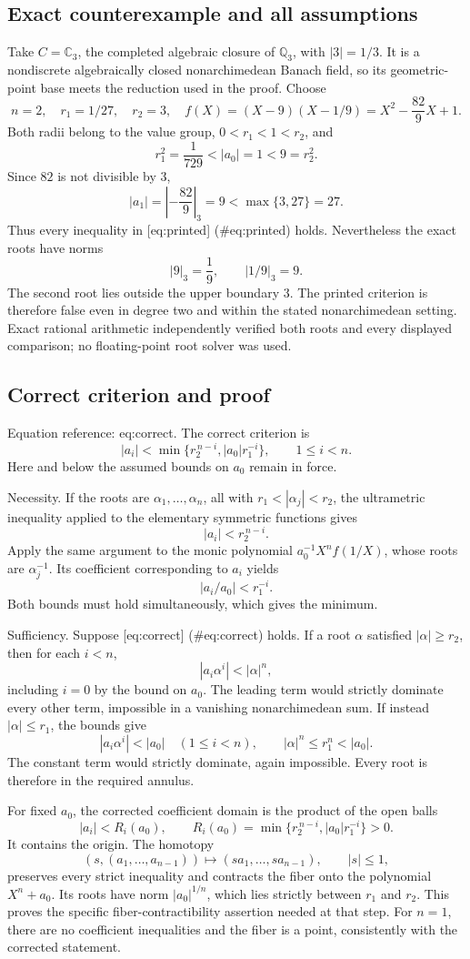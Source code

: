 \documentclass[10pt]{article}
\begin{document}
\subsection*{Exact counterexample and all assumptions}
Take \(C=\mathbb C_3\), the completed algebraic closure of \(\mathbb Q_3\), with \(|3|=1/3\). It is a nondiscrete algebraically closed nonarchimedean Banach field, so its geometric-point base meets the reduction used in the proof. Choose \[n=2,\quad r_1=1/27,\quad r_2=3,\quad
f(X)=(X-9)(X-1/9)=X^2-\frac{82}{9}X+1.\] Both radii belong to the value group, \(0<r_1<1<r_2\), and \[r_1^2=\frac1{729}<|a_0|=1<9=r_2^2.\] Since \(82\) is not divisible by \(3\), \[|a_1|=\left|-\frac{82}{9}\right|_3=9
 <\max\{3,27\}=27.\] Thus every inequality in [eq:printed] (\#eq:printed) holds. Nevertheless the exact roots have norms \[|9|_3=\frac19,\qquad |1/9|_3=9.\] The second root lies outside the upper boundary \(3\). The printed criterion is therefore false even in degree two and within the stated nonarchimedean setting. Exact rational arithmetic independently verified both roots and every displayed comparison; no floating-point root solver was used.\par
\subsection*{Correct criterion and proof}
Equation reference: eq:correct. The correct criterion is \[
|a_i|<\min\{r_2^{\,n-i},|a_0|r_1^{-i}\},
\qquad 1\leq i<n.\] Here and below the assumed bounds on \(a_0\) remain in force.\par
Necessity. If the roots are \(\alpha_1,\ldots,\alpha_n\), all with \(r_1<|\alpha_j|<r_2\), the ultrametric inequality applied to the elementary symmetric functions gives \[|a_i|<r_2^{\,n-i}.\] Apply the same argument to the monic polynomial \(a_0^{-1}X^n f(1/X)\), whose roots are \(\alpha_j^{-1}\). Its coefficient corresponding to \(a_i\) yields \[|a_i/a_0|<r_1^{-i}.\] Both bounds must hold simultaneously, which gives the minimum.\par
Sufficiency. Suppose [eq:correct] (\#eq:correct) holds. If a root \(\alpha\) satisfied \(|\alpha|\geq r_2\), then for each \(i<n\), \[|a_i\alpha^i|<|\alpha|^n,\] including \(i=0\) by the bound on \(a_0\). The leading term would strictly dominate every other term, impossible in a vanishing nonarchimedean sum. If instead \(|\alpha|\leq r_1\), the bounds give \[|a_i\alpha^i|<|a_0|\quad(1\leq i<n),
\qquad |\alpha|^n\leq r_1^n<|a_0|.\] The constant term would strictly dominate, again impossible. Every root is therefore in the required annulus.\par
For fixed \(a_0\), the corrected coefficient domain is the product of the open balls \[|a_i|<R_i(a_0),\qquad
R_i(a_0)=\min\{r_2^{\,n-i},|a_0|r_1^{-i}\}>0.\] It contains the origin. The homotopy \[(s,(a_1,\ldots,a_{n-1}))
 \longmapsto (s a_1,\ldots,s a_{n-1}),\qquad |s|\leq1,\] preserves every strict inequality and contracts the fiber onto the polynomial \(X^n+a_0\). Its roots have norm \(|a_0|^{1/n}\), which lies strictly between \(r_1\) and \(r_2\). This proves the specific fiber-contractibility assertion needed at that step. For \(n=1\), there are no coefficient inequalities and the fiber is a point, consistently with the corrected statement.\par
\end{document}
